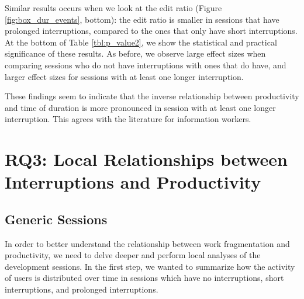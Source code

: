 \documentclass[conference]{IEEEtran}
\begin{document}



Similar results occurs when we look at the edit ratio (Figure \ref{fig:box_dur_events}, bottom): the edit ratio is smaller in sessions that have prolonged interruptions, compared to the ones that only have short interruptions. At the bottom of Table \ref{tbl:p_value2}, we show the statistical and practical significance of these results. As before, we observe large effect sizes when comparing sessions who do not have interruptions with ones that do have, and larger effect sizes for sessions with at least one longer interruption.

These findings seem to indicate that the inverse relationship between productivity and time of duration is more pronounced in session with at least one longer interruption. This agrees with the literature for information workers.

\section{RQ3: Local Relationships between Interruptions and Productivity}

\subsection{Generic Sessions}
In order to better understand the relationship between work fragmentation and productivity, we need to delve deeper and perform local analyses of the development sessions. In the first step, we wanted to summarize how the activity of users is distributed over time in sessions which have no interruptions, short interruptions, and prolonged interruptions. 
\end{document}
